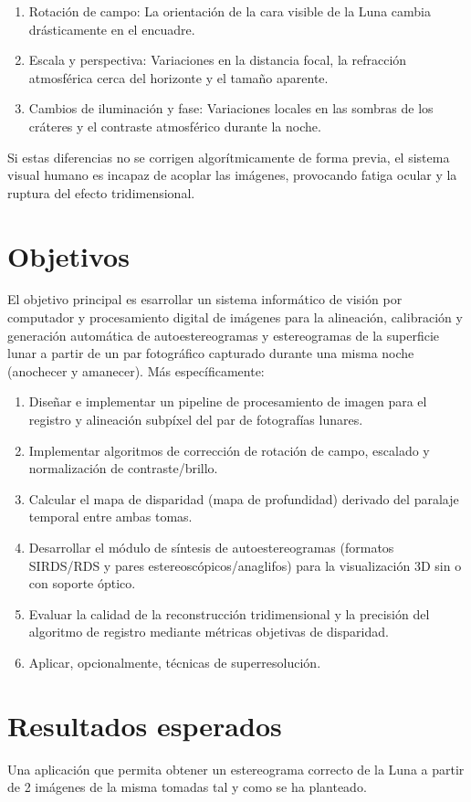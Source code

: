 \documentclass[11pt,a4paper]{article}
\begin{document}
\begin{enumerate}
\item Rotación de campo: La orientación de la cara visible de la Luna cambia drásticamente en el encuadre.
\item Escala y perspectiva: Variaciones en la distancia focal, la refracción atmosférica cerca del horizonte y el tamaño aparente.
\item Cambios de iluminación y fase: Variaciones locales en las sombras de los cráteres y el contraste atmosférico durante la noche.
\end{enumerate}
	
Si estas diferencias no se corrigen algorítmicamente de forma previa, el sistema visual humano es incapaz de acoplar las imágenes, provocando fatiga ocular y la ruptura del efecto tridimensional.

\section*{Objetivos}

El objetivo principal es esarrollar un sistema informático de visión por computador y procesamiento digital de imágenes para la alineación, calibración y generación automática de autoestereogramas y estereogramas de la superficie lunar a partir de un par fotográfico capturado durante una misma noche (anochecer y amanecer). Más específicamente:

\begin{enumerate}
\item Diseñar e implementar un pipeline de procesamiento de imagen para el registro y alineación subpíxel del par de fotografías lunares.
\item Implementar algoritmos de corrección de rotación de campo, escalado y normalización de contraste/brillo.
\item Calcular el mapa de disparidad (mapa de profundidad) derivado del paralaje temporal entre ambas tomas.
\item Desarrollar el módulo de síntesis de autoestereogramas (formatos SIRDS/RDS y pares estereoscópicos/anaglifos) para la visualización 3D sin o con soporte óptico.
\item Evaluar la calidad de la reconstrucción tridimensional y la precisión del algoritmo de registro mediante métricas objetivas de disparidad.
\item Aplicar, opcionalmente, técnicas de superresolución.
\end{enumerate}
	
\section*{Resultados esperados}

Una aplicación que permita obtener un estereograma correcto de la Luna a partir de 2 imágenes de la misma tomadas tal y como se ha planteado.
	
\end{document}
